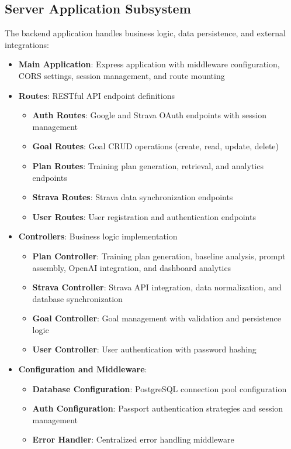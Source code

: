 \subsection{Server Application Subsystem}

The backend application handles business logic, data persistence, and external integrations:

\begin{itemize}
    \item \textbf{Main Application}: Express application with middleware configuration, CORS settings, session management, and route mounting
    \item \textbf{Routes}: RESTful API endpoint definitions
    \begin{itemize}
        \item \textbf{Auth Routes}: Google and Strava OAuth endpoints with session management
        \item \textbf{Goal Routes}: Goal CRUD operations (create, read, update, delete)
        \item \textbf{Plan Routes}: Training plan generation, retrieval, and analytics endpoints
        \item \textbf{Strava Routes}: Strava data synchronization endpoints
        \item \textbf{User Routes}: User registration and authentication endpoints
    \end{itemize}
    \item \textbf{Controllers}: Business logic implementation
    \begin{itemize}
        \item \textbf{Plan Controller}: Training plan generation, baseline analysis, prompt assembly, OpenAI integration, and dashboard analytics
        \item \textbf{Strava Controller}: Strava API integration, data normalization, and database synchronization
        \item \textbf{Goal Controller}: Goal management with validation and persistence logic
        \item \textbf{User Controller}: User authentication with password hashing
    \end{itemize}
    \item \textbf{Configuration and Middleware}:
    \begin{itemize}
        \item \textbf{Database Configuration}: PostgreSQL connection pool configuration
        \item \textbf{Auth Configuration}: Passport authentication strategies and session management
        \item \textbf{Error Handler}: Centralized error handling middleware
    \end{itemize}
\end{itemize}


